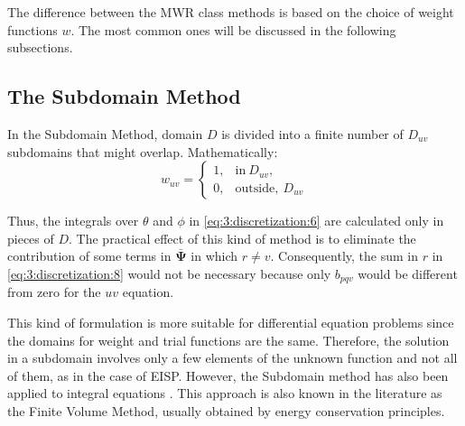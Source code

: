 		The difference between the MWR class methods is based on the choice of weight functions $w$. The most common ones will be discussed in the following subsections.
		
		\subsection{The Subdomain Method}\label{chap:methods:discretization:subdomain}
		
			In the Subdomain Method, domain $D$ is divided into a finite number of $D_{uv}$ subdomains that might overlap. Mathematically:
			\begin{equation}
				w_{uv} = \begin{cases}
						          1,& \mathrm{in} ~D_{uv}, \\
						          0,& \mathrm{outside}, ~D_{uv}
						      \end{cases} \label{eq:3:discretization:subdomain}
			\end{equation}
		
			Thus, the integrals over $\theta$ and $\phi$ in \eqref{eq:3:discretization:6} are calculated only in pieces of $D$. The practical effect of this kind of method is to eliminate the contribution of some terms in $\boldsymbol{\bar{\Psi}}$ in which $r\neq v$. Consequently, the sum in $r$ in \eqref{eq:3:discretization:8} would not be necessary because only $b_{pqv}$ would be different from zero for the $uv$ equation.
			
			This kind of formulation is more suitable for differential equation problems since the domains for weight and trial functions are the same. Therefore, the solution in a subdomain involves only a few elements of the unknown function and not all of them, as in the case of EISP. However, the Subdomain method has also been applied to integral equations \citep{gabbasov2014special,deputat2005quadratic}. This approach is also known in the literature as the Finite Volume Method, usually obtained by energy conservation principles.
			
